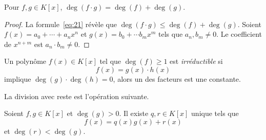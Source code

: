 \begin{theorem}
  \label{thr:34}

  Pour $f,g \in K[x] $, $\deg(f \cdot g) = \deg(f) + \deg(g)$. 
\end{theorem}
\begin{proof}
  La formule~\eqref{eq:21} révèle que $\deg(f\cdot g) \leq \deg(f) + \deg(g)$. 
  Soient $f(x) = a_0 + \cdots + a_n x^n$ et $g(x) = b_0+ \cdots b_m x^m$ tels que $a_n, b_m  \neq 0$. Le coefficient de $x^{n+m}$  est $a_n \cdot  b_m \neq 0$.
\end{proof}

\begin{definition}
  \label{def:30}
  Un polynôme $f(x) \in K[x]$
  tel que $\deg(f) \geq 1$ est \emph{irréductible} si
  \begin{displaymath}
    f(x) = g(x) \cdot h(x) 
  \end{displaymath}
implique $\deg(g) \cdot \deg(h) = 0$, alors un des facteurs est une constante. 
\end{definition}




La division avec reste est l'opération suivante. 

\begin{theorem}
  \label{thr:33}
  Soient $f,g \in K[x]$ et $\deg(g) >0$. Il existe $q,r \in K[x]$ unique  tels que 
  \begin{displaymath}
    f(x) = q(x) g(x) + r(x) 
  \end{displaymath}
  et $\deg(r) < \deg(g)$. 
\end{theorem}


